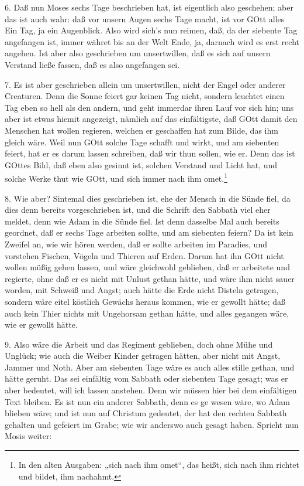 6. Daß nun Moses sechs Tage beschrieben hat, ist eigentlich also geschehen; aber das ist auch wahr: daß vor unsern Augen sechs Tage macht, ist vor GOtt alles Ein Tag, ja ein Augenblick. Also wird sich’s nun reimen, daß, da der siebente Tag angefangen ist, immer währet bis an der Welt Ende, ja, darnach wird es erst recht angehen. Ist aber also geschrieben um unsertwillen, daß es sich auf unsern Verstand ließe fassen, daß es also angefangen sei.

7. Es ist aber geschrieben allein um unsertwillen, nicht der Engel oder anderer Creaturen. Denn die Sonne feiert gar keinen Tag nicht, sondern leuchtet einen Tag eben so hell als den andern, und geht immerdar ihren Lauf vor sich hin; uns aber ist etwas hiemit angezeigt, nämlich auf das einfältigste, daß GOtt damit den Menschen hat wollen regieren, welchen er geschaffen hat zum Bilde, das ihm gleich wäre. Weil nun GOtt solche Tage schafft und wirkt, und am siebenten feiert, hat er es darum lassen schreiben, daß wir thun sollen, wie er. Denn das ist GOttes Bild, daß eben also gesinnt ist, solchen Verstand und Licht hat, und solche Werke thut wie GOtt, und sich immer nach ihm omet.\footnote{In den alten Ausgaben: „sich nach ihm omet“, das heißt, sich nach ihm richtet und bildet, ihm nachahmt.}

8. Wie aber? Sintemal dies geschrieben ist, ehe der Mensch in die Sünde fiel, da dies denn bereits vorgeschrieben ist, und die Schrift den Sabbath viel eher meldet, denn wie Adam in die Sünde fiel. Ist denn dasselbe Mal auch bereits geordnet, daß er sechs Tage arbeiten sollte, und am siebenten feiern? Da ist kein Zweifel an, wie wir hören werden, daß er sollte arbeiten im Paradies, und vorstehen Fischen, Vögeln und Thieren auf Erden. Darum hat ihn GOtt nicht wollen müßig gehen lassen, und wäre gleichwohl geblieben, daß er arbeitete und regierte, ohne daß er es nicht mit Unlust gethan hätte, und wäre ihm nicht sauer worden, mit Schweiß und Angst; auch hätte die Erde nicht Disteln getragen, sondern wäre eitel köstlich Gewächs heraus kommen, wie er gewollt hätte; daß auch kein Thier nichts mit Ungehorsam gethan hätte, und alles gegangen wäre, wie er gewollt hätte.

9. Also wäre die Arbeit und das Regiment geblieben, doch ohne Mühe und Unglück; wie auch die Weiber Kinder getragen hätten, aber nicht mit Angst, Jammer und Noth. Aber am siebenten Tage wäre es auch alles stille gethan, und hätte geruht. Das sei einfältig vom Sabbath oder siebenten Tage gesagt; was er aber bedeutet, will ich lassen anstehen. Denn wir müssen hier bei dem einfältigen Text bleiben. Es ist nun ein anderer Sabbath, denn es ge
wesen wäre, wo Adam blieben wäre; und ist nun auf Christum gedeutet, der hat den rechten Sabbath gehalten und gefeiert im Grabe; wie wir anderswo auch gesagt haben. Spricht nun Mosis weiter:

